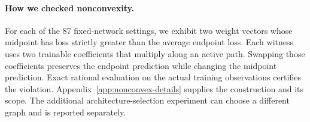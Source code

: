 \paragraph{How we checked nonconvexity.}
For each of the 87 fixed-network settings, we exhibit two weight vectors whose midpoint has loss strictly greater than the average endpoint loss. Each witness uses two trainable coefficients that multiply along an active path. Swapping those coefficients preserves the endpoint prediction while changing the midpoint prediction. Exact rational evaluation on the actual training observations certifies the violation. Appendix~\ref{app:nonconvex-details} supplies the construction and its scope. The additional architecture-selection experiment can choose a different graph and is reported separately.

